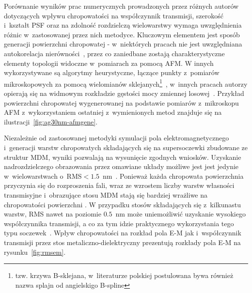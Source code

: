 Porównanie wyników prac numerycznych prowadzonych przez różnych autorów dotyczących wpływu chropowatości na współczynnik transmisji, szerokość i~kształt PSF oraz na zdolność rozdzielczą wielowarstwy wymaga uwzględnienia różnic w~zastosowanej przez nich metodyce. Kluczowym elementem jest sposób generacji powierzchni chropowatej - w~niektórych pracach nie jest uwzględniana autokorelacja nierówności~\cite{guo2014negative}, przez co zaniedbane zostają charakterystyczne elementy topologii widoczne w~pomiarach za pomocą AFM. W innych wykorzystywane są algorytmy heurystyczne, łączące punkty z~pomiarów mikroskopowych za pomocą wielomianów sklejanych\footnote{tzw. krzywa B-sklejana, w~literaturze polskiej postulowana bywa również nazwa splajn od angielskigo B-spline}~\cite{ludwig2012impact}, w~innych pracach autorzy opierają się na widmowym rozkładzie gęstości mocy zmiennej losowej~\cite{pastuszczak2013engineering}. Przykład powierzchni chropowatej wygenerowanej na podstawie pomiarów z~mikroskopu AFM z~wykorzystaniem ostatniej z~wymienionych metod znajduje się na ilustracji~\ref{fig:ag30nm-afmgene}.

Niezależnie od zastosowanej metodyki symulacji pola elektromagnetycznego i~generacji warstw chropowatych składających się na supersoczewki zbudowane ze struktur MDM, wyniki pozwalają na wysunięcie zgodnych wniosków. Uzyskanie nadrozdzielczego obrazowania przez omawiane układy  możliwe jest jest jedynie w~wielowarstwach o~RMS$<1.5$~nm~\citep{guo2014negative,stefaniuk2011effect,ludwig2012impact}. Ponieważ każda chropowata powierzchnia przyczynia się do rozproszenia fali, wraz ze wzrostem liczby warstw własności transmisyjne i~obrazujące stosu MDM stają się bardziej wrażliwe na chropowatości powierzchni \cite{guo2014negative}. W przypadku stosów składających się z~kilkunastu warstw, RMS nawet na poziomie $0.5$~nm może uniemożliwić uzyskanie wysokiego współczynnika transmisji, a co za tym idzie praktycznego wykorzystania tego typu soczewek~\cite{pastuszczak2013engineering}. Wpływ chropowatości na rozkład pola E-M jak i~współczynnik transmisji przez stos metaliczno-dielektryczny prezentują rozkłady pola E-M na rysunku~\ref{fig:rmsem}.








